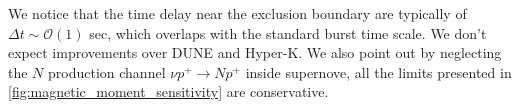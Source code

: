We notice that the time delay near the exclusion boundary are typically of $\Delta t \sim \mathcal{O}(1)$ sec, which overlaps with the standard burst time scale. We don't expect improvements over DUNE and Hyper-K. We also point out by neglecting the $N$ production channel $\nu p^+\to N p^+$ inside supernove, all the limits presented in \cref{fig:magnetic_moment_sensitivity} are conservative. 